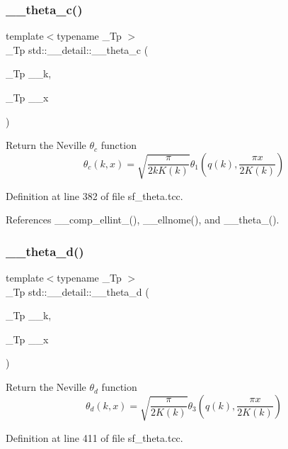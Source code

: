 \subsubsection{\texorpdfstring{\+\_\+\+\_\+theta\+\_\+c()}{\_\_theta\_c()}}
{\footnotesize\ttfamily template$<$typename \+\_\+\+Tp $>$ \\
\+\_\+\+Tp std\+::\+\_\+\+\_\+detail\+::\+\_\+\+\_\+theta\+\_\+c (\begin{DoxyParamCaption}\item[{\+\_\+\+Tp}]{\+\_\+\+\_\+k,  }\item[{\+\_\+\+Tp}]{\+\_\+\+\_\+x }\end{DoxyParamCaption})}

Return the Neville $ \theta_c $ function \[ \theta_c(k,x) = \sqrt{\frac{\pi}{2 k K(k)}} \theta_1\left(q(k),\frac{\pi x}{2K(k)}\right) \] 

Definition at line 382 of file sf\+\_\+theta.\+tcc.



References \+\_\+\+\_\+comp\+\_\+ellint\+\_(), \+\_\+\+\_\+ellnome(), and \+\_\+\+\_\+theta\+\_().

\mbox{\label{namespacestd_1_1____detail_ad4ca29063a2f624e185592497d37a670}} 
\subsubsection{\texorpdfstring{\+\_\+\+\_\+theta\+\_\+d()}{\_\_theta\_d()}}
{\footnotesize\ttfamily template$<$typename \+\_\+\+Tp $>$ \\
\+\_\+\+Tp std\+::\+\_\+\+\_\+detail\+::\+\_\+\+\_\+theta\+\_\+d (\begin{DoxyParamCaption}\item[{\+\_\+\+Tp}]{\+\_\+\+\_\+k,  }\item[{\+\_\+\+Tp}]{\+\_\+\+\_\+x }\end{DoxyParamCaption})}

Return the Neville $ \theta_d $ function \[ \theta_d(k,x) = \sqrt{\frac{\pi}{2K(k)}} \theta_3\left(q(k),\frac{\pi x}{2K(k)}\right) \] 

Definition at line 411 of file sf\+\_\+theta.\+tcc.



